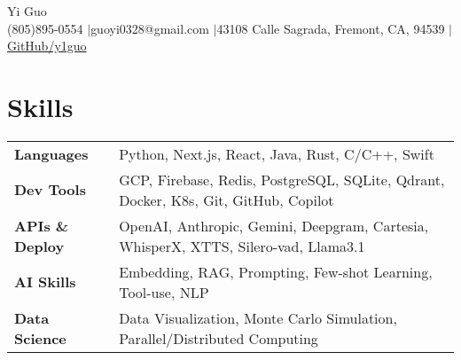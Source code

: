 \documentclass[letterpaper,12pt]{article}
\begin{document}
\newcommand{\name}{Yi Guo}
\newcommand{\phone}{(805)895-0554}
\newcommand{\email}{guoyi0328@gmail.com}
\newcommand{\address}{43108 Calle Sagrada, Fremont, CA, 94539}
\newcommand{\github}{y1guo}
\newcommand{\linkedin}{y1guo}
\newcommand{\website}{https://y1guo.github.io}

\begin{center}
    \Huge \name \\
    \vspace{1pt}
    \small \phone 
    $|$\email
    $|$\address
    $|$\href{https://github.com/\github}{GitHub/\github}
    \vspace{-10pt}
\end{center}





\vspace{-0.9em}
\section{Skills}
\vspace{0.3em}

\begin{tabular}{p{7em} p{38em}}
    \textbf{Languages}
    & Python, Next.js, React, Java, Rust, C/C++, Swift \\
    \textbf{Dev Tools}
    & GCP, Firebase, Redis, PostgreSQL, SQLite, Qdrant, Docker, K8s, Git, GitHub, Copilot \\
    \textbf{APIs \& Deploy}
    & OpenAI, Anthropic, Gemini, Deepgram, Cartesia, WhisperX, XTTS, Silero-vad, Llama3.1 \\
    \textbf{AI Skills}
    & Embedding, RAG, Prompting, Few-shot Learning, Tool-use, NLP \\
    \textbf{Data Science}
    & Data Visualization, Monte Carlo Simulation, Parallel/Distributed Computing \\
\end{tabular}
\end{document}
